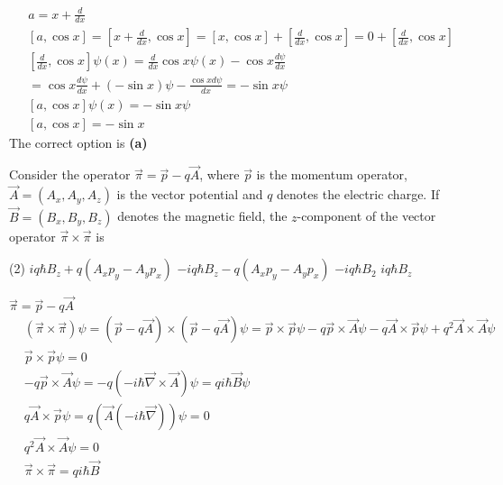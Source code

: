 \begin{enumerate}
\begin{answer}
	\begin{align*}
	&a=x+\frac{d}{d x}\\
		&{[a, \cos x]=\left[x+\frac{d}{d x}, \cos x\right]=[x, \cos x]+\left[\frac{d}{d x}, \cos x\right]=0+\left[\frac{d}{d x}, \cos x\right]} \\
		&{\left[\frac{d}{d x}, \cos x\right] \psi(x)=\frac{d}{d x} \cos x \psi(x)-\cos x \frac{d \psi}{d x}} \\
		&=\cos x \frac{d \psi}{d x}+(-\sin x) \psi-\frac{\cos x d \psi}{d x}=-\sin x \psi \\
		&{[a, \cos x] \psi(x)=-\sin x \psi} \\
		&{[a, \cos x]=-\sin x}
	\end{align*}
	The correct option is \textbf{(a)}
\end{answer}
\begin{minipage}{\textwidth}
	\item Consider the operator $\vec{\pi}=\vec{p}-q \vec{A}$, where $\vec{p}$ is the momentum operator, $\vec{A}=\left(A_{x}, A_{y}, A_{z}\right)$ is the vector potential and $q$ denotes the electric charge. If $\vec{B}=\left(B_{x}, B_{y}, B_{z}\right)$ denotes the magnetic field, the $z$-component of the vector operator $\vec{\pi} \times \vec{\pi}$ is
\end{minipage}
\begin{tasks}(2)
	\task[\textbf{A.}] $i q \hbar B_{z}+q\left(A_{x} p_{y}-A_{y} p_{x}\right)$
	\task[\textbf{B.}]$-i q \hbar B_{z}-q\left(A_{x} p_{y}-A_{y} p_{x}\right)$
	\task[\textbf{C.}]$-i q \hbar B_{2}$
	\task[\textbf{D.}] $i q \hbar B_{z}$
\end{tasks}
\begin{answer}
	$\vec{\pi}=\vec{p}-q \vec{A}$\\
	\begin{align*}
	&(\vec{\pi} \times \vec{\pi}) \psi=(\vec{p}-q \vec{A}) \times(\vec{p}-q \vec{A}) \psi=\vec{p} \times \vec{p} \psi-q \vec{p} \times \vec{A} \psi-q \vec{A} \times \vec{p} \psi+q^{2} \vec{A} \times \vec{A} \psi \\
	&\vec{p} \times \vec{p} \psi=0 \\
	&-q \vec{p} \times \vec{A} \psi=-q(-i \hbar \vec{\nabla} \times \vec{A}) \psi=q i \hbar \vec{B} \psi \\
	&q \vec{A} \times \vec{p} \psi=q(\vec{A}(-i \hbar \vec{\nabla})) \psi=0 \\
	&q^{2} \vec{A} \times \vec{A} \psi=0 \\
	&\vec{\pi} \times \vec{\pi}=q i \hbar \vec{B}
	\end{align*}

\end{answer}
\end{enumerate}
